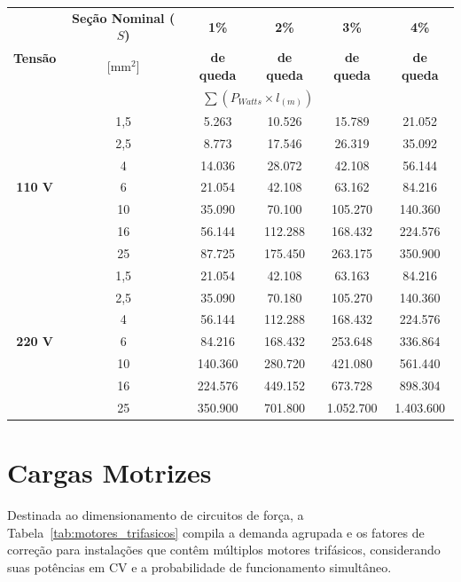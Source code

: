 \documentclass[12pt,openright,oneside,a4paper,brazil]{abntex2}
\begin{document}
\begin{table}[H]
\begin{tabular}{c|c|c|c|c|c}
\hline
\multirow{3}{*}{\textbf{Tensão}} & \textbf{Seção Nominal ($S$)} & \textbf{1\%} & \textbf{2\%} & \textbf{3\%} & \textbf{4\%} \\
 & {[mm$^2$]} & \textbf{de queda} & \textbf{de queda} & \textbf{de queda} & \textbf{de queda} \\ \cline{2-6}
 & \multicolumn{5}{c}{\small{$\sum  (P_{Watts} \times l_{(m)})$}} \\ 
\hline
\multirow{7}{*}{\textbf{110 V}} 
 & 1,5 & 5.263 & 10.526 & 15.789 & 21.052 \\ \cline{2-6}
 & 2,5 & 8.773 & 17.546 & 26.319 & 35.092 \\ \cline{2-6}
 & 4   & 14.036 & 28.072 & 42.108 & 56.144 \\ \cline{2-6}
 & 6   & 21.054 & 42.108 & 63.162 & 84.216 \\ \cline{2-6}
 & 10  & 35.090 & 70.100 & 105.270 & 140.360 \\ \cline{2-6}
 & 16  & 56.144 & 112.288 & 168.432 & 224.576 \\ \cline{2-6}
 & 25  & 87.725 & 175.450 & 263.175 & 350.900 \\ \hline \hline
\multirow{7}{*}{\textbf{220 V}} 
 & 1,5 & 21.054 & 42.108 & 63.163 & 84.216 \\ \cline{2-6}
 & 2,5 & 35.090 & 70.180 & 105.270 & 140.360 \\ \cline{2-6}
 & 4   & 56.144 & 112.288 & 168.432 & 224.576 \\ \cline{2-6}
 & 6   & 84.216 & 168.432 & 253.648 & 336.864 \\ \cline{2-6}
 & 10  & 140.360 & 280.720 & 421.080 & 561.440 \\ \cline{2-6}
 & 16  & 224.576 & 449.152 & 673.728 & 898.304 \\ \cline{2-6}
 & 25  & 350.900 & 701.800 & 1.052.700 & 1.403.600 \\
\hline
\end{tabular}
        \vspace{0.15cm}
\end{table}


\section{Cargas Motrizes}

\hspace{1.27cm}Destinada ao dimensionamento de circuitos de força, a Tabela~\ref{tab:motores_trifasicos} compila a demanda agrupada e os fatores de correção para instalações que contêm múltiplos motores trifásicos, considerando suas potências em CV e a probabilidade de funcionamento simultâneo.
\end{document}
